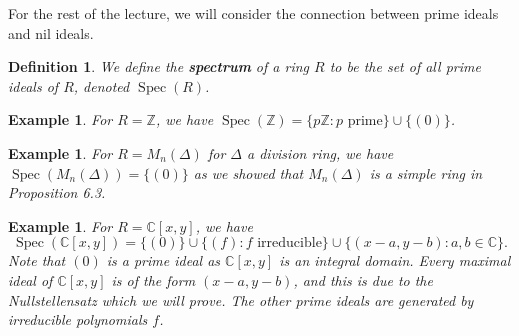 \documentclass[10pt]{article}
\numberwithin{equation}{section}
\newcommand{\C}{\mathbb{C}}
\newcommand{\Z}{\mathbb{Z}}
\DeclareMathOperator{\Spec}{Spec}
\theoremstyle{newstyle}
\newtheorem{defn}[thm]{Definition}
\newtheorem{exmp}[thm]{Example}
\begin{document}
For the rest of the lecture, we will consider the connection between prime ideals and nil ideals. 

\begin{defn}
We define the {\bf spectrum} of a ring $R$ to be the set of all prime ideals of $R$,
denoted $\Spec(R)$. 
\end{defn}

\begin{exmp}
For $R = \Z$, we have $\Spec(\Z) = \{p\Z : p \text{ prime}\} \cup \{(0)\}$. 
\end{exmp}

\begin{exmp}
For $R = M_n(\Delta)$ for $\Delta$ a division ring, we have $\Spec(M_n(\Delta)) = \{(0)\}$ as we 
showed that $M_n(\Delta)$ is a simple ring in Proposition 6.3.
\end{exmp}

\begin{exmp}
For $R = \C[x, y]$, we have
\[ \Spec(\C[x, y]) = \{(0)\} \cup \{(f) : f \text{ irreducible}\} \cup \{(x-a, y-b) : a, b \in \C\}. \]
Note that $(0)$ is a prime ideal as $\C[x, y]$ is an integral domain. Every maximal ideal of 
$\C[x, y]$ is of the form $(x-a, y-b)$, and this is due to the Nullstellensatz which we will prove. 
The other prime ideals are generated by irreducible polynomials $f$. 
\end{exmp}
\end{document}
